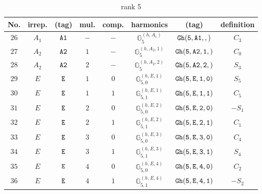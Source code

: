 \documentclass[fleqn,8pt]{jsarticle}
\begin{document}
\begin{table}[ht!]
\begin{center}
\caption{rank 5}
\renewcommand{\arraystretch}{1.3}
\begin{tabular}{cccccccc} \hline \hline
No. & irrep. & (tag) & mul. & comp. & harmonics & (tag) & definition \\ \hline
$ 26 $ & $ A_{1} $ & $ {\tt A1} $ & $ - $ & $ - $ & $ \mathbb{G}_{5}^{(h,A_{1})} $ & $ {\tt Gh(5,A1,,)} $ & $ C_{3} $ \\
$ 27 $ & $ A_{2} $ & $ {\tt A2} $ & $ 1 $ & $ - $ & $ \mathbb{G}_{5}^{(h,A_{2},1)} $ & $ {\tt Gh(5,A2,1,)} $ & $ C_{0} $ \\
$ 28 $ & $ A_{2} $ & $ {\tt A2} $ & $ 2 $ & $ - $ & $ \mathbb{G}_{5}^{(h,A_{2},2)} $ & $ {\tt Gh(5,A2,2,)} $ & $ S_{3} $ \\
$ 29 $ & $ E $ & $ {\tt E} $ & $ 1 $ & $ 0 $ & $ \mathbb{G}_{5,0}^{(h,E,1)} $ & $ {\tt Gh(5,E,1,0)} $ & $ S_{5} $ \\
$ 30 $ & $ E $ & $ {\tt E} $ & $ 1 $ & $ 1 $ & $ \mathbb{G}_{5,1}^{(h,E,1)} $ & $ {\tt Gh(5,E,1,1)} $ & $ C_{5} $ \\
$ 31 $ & $ E $ & $ {\tt E} $ & $ 2 $ & $ 0 $ & $ \mathbb{G}_{5,0}^{(h,E,2)} $ & $ {\tt Gh(5,E,2,0)} $ & $ - S_{1} $ \\
$ 32 $ & $ E $ & $ {\tt E} $ & $ 2 $ & $ 1 $ & $ \mathbb{G}_{5,1}^{(h,E,2)} $ & $ {\tt Gh(5,E,2,1)} $ & $ C_{1} $ \\
$ 33 $ & $ E $ & $ {\tt E} $ & $ 3 $ & $ 0 $ & $ \mathbb{G}_{5,0}^{(h,E,3)} $ & $ {\tt Gh(5,E,3,0)} $ & $ C_{4} $ \\
$ 34 $ & $ E $ & $ {\tt E} $ & $ 3 $ & $ 1 $ & $ \mathbb{G}_{5,1}^{(h,E,3)} $ & $ {\tt Gh(5,E,3,1)} $ & $ S_{4} $ \\
$ 35 $ & $ E $ & $ {\tt E} $ & $ 4 $ & $ 0 $ & $ \mathbb{G}_{5,0}^{(h,E,4)} $ & $ {\tt Gh(5,E,4,0)} $ & $ C_{2} $ \\
$ 36 $ & $ E $ & $ {\tt E} $ & $ 4 $ & $ 1 $ & $ \mathbb{G}_{5,1}^{(h,E,4)} $ & $ {\tt Gh(5,E,4,1)} $ & $ - S_{2} $ \\
 \hline \hline
\end{tabular}
\end{center}
\end{table}
\end{document}

